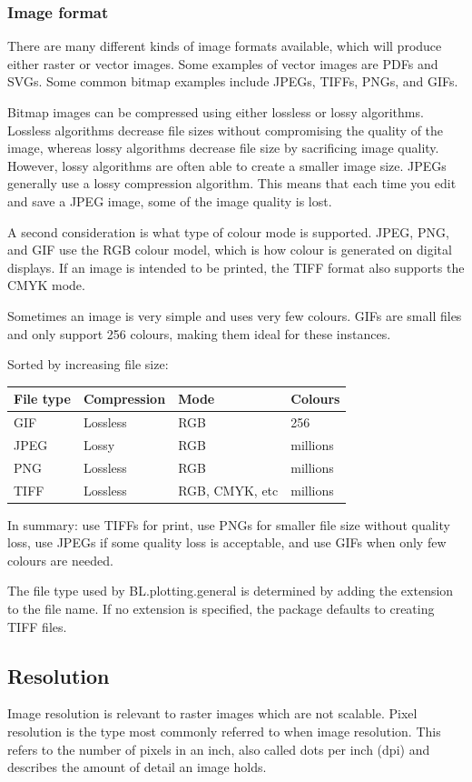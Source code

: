 \documentclass[letterpaper]{article}
\begin{document}
\subsubsection{Image format}
There are many different kinds of image formats available, which will produce either raster or vector images. Some examples of vector images are PDFs and SVGs. Some common bitmap examples include JPEGs, TIFFs, PNGs, and GIFs. 

Bitmap images can be compressed using either lossless or lossy algorithms. Lossless algorithms decrease file sizes without compromising the quality of the image, whereas lossy algorithms decrease file size by sacrificing image quality. However, lossy algorithms are often able to create a smaller image size. JPEGs generally use a lossy compression algorithm. This means that each time you edit and save a JPEG image, some of the image quality is lost. 

A second consideration is what type of colour mode is supported. JPEG, PNG, and GIF use the RGB colour model, which is how colour is generated on digital displays. If an image is intended to be printed, the TIFF format also supports the CMYK mode.

Sometimes an image is very simple and uses very few colours. GIFs are small files and only support 256 colours, making them ideal for these instances.

Sorted by increasing file size:
\begin{center}
\begin{tabular}{l l l l }
\hline
File type & Compression & Mode & Colours \\
\hline
GIF & Lossless & RGB & 256 \\
JPEG &  Lossy & RGB & millions\\
PNG &Lossless & RGB &  millions \\
TIFF & Lossless & RGB, CMYK, etc & millions \\
\end{tabular}
\end{center}
\bigskip
In summary: use TIFFs for print, use PNGs for smaller file size without quality loss, use JPEGs if some quality loss is acceptable, and use GIFs when only few colours are needed.

The file type used by BL.plotting.general is determined by adding the extension to the file name. If no extension is specified, the package defaults to creating TIFF files.

\subsection{Resolution}
Image resolution is relevant to raster images which are not scalable. Pixel resolution is the type most commonly referred to when image resolution. This refers to the number of pixels in an inch, also called dots per inch (dpi) and describes the amount of detail an image holds.
\end{document}
